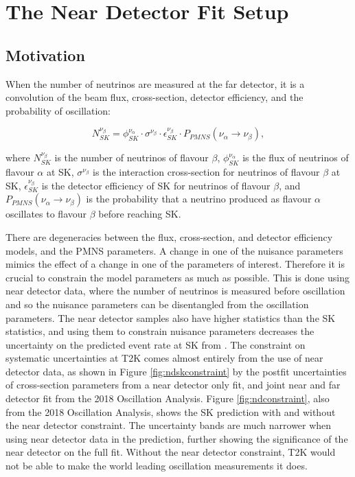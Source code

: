 \newpage
\newpage
\chapter{The Near Detector Fit Setup}\label{sec:FitSetup}
\section{Motivation}

When the number of neutrinos are measured at the far detector, it is a convolution of the beam flux, cross-section, detector efficiency, and the probability of oscillation:

\begin{equation}
N^{\nu_{\beta}}_{SK} = \phi^{\nu_\alpha}_{SK} \cdot \sigma^{\nu_{\beta}} \cdot \epsilon^{\nu_{\beta}}_{SK} \cdot P_{PMNS}(\nu_{\alpha}\rightarrow\nu_{\beta}),
\end{equation}

where $N^{\nu_\beta}_{SK}$ is the number of neutrinos of flavour $\beta$, $\phi^{\nu_\alpha}_{SK}$ is the flux of neutrinos of flavour $\alpha$ at SK, $\sigma^{\nu_{\beta}}$ is the interaction cross-section for neutrinos of flavour $\beta$ at SK, $\epsilon^{\nu_\beta}_{SK} $ is the detector efficiency of SK for neutrinos of flavour $\beta$, and $P_{PMNS}(\nu_{\alpha}\rightarrow\nu_{\beta})$ is the probability that a neutrino produced as flavour $\alpha$ oscillates to flavour $\beta$ before reaching SK.

There are degeneracies between the flux, cross-section, and detector efficiency models, and the PMNS parameters. A change in one of the nuisance parameters mimics the effect of a change in one of the parameters of interest. Therefore it is crucial to constrain the model parameters as much as possible. This is done using near detector data, where the number of neutrinos is measured before oscillation and so the  nuisance parameters can be disentangled from the oscillation parameters. The near detector samples also have higher statistics than the SK statistics, and using them to constrain nuisance parameters decreases the uncertainty on the predicted event rate at SK from . The constraint on systematic uncertainties at T2K comes almost entirely from the use of near detector data, as shown in Figure \ref{fig:ndskconstraint} by the postfit uncertainties of cross-section parameters from a near detector only fit, and joint near and far detector fit from the 2018 Oscillation Analysis. Figure \ref{fig:ndconstraint}, also from the 2018 Oscillation Analysis, shows the SK prediction with and without the near detector constraint. The uncertainty bands are much narrower when using near detector data in the prediction, further showing the significance of the near detector on the full fit. Without the near detector constraint, T2K would not be able to make the world leading oscillation measurements it does.

